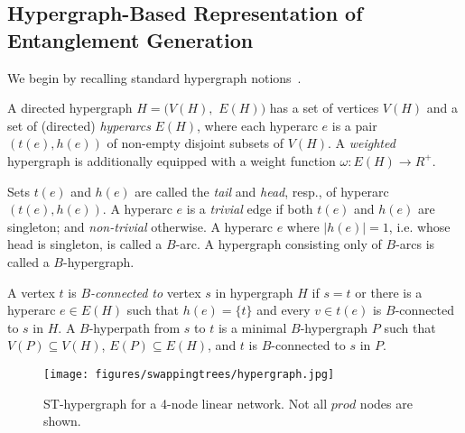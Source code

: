 \subsection{Hypergraph-Based Representation of Entanglement Generation}
We begin by recalling standard hypergraph notions~\cite{Beckenbach2019,GalloEtAl1993,ThakurTripathi2009}.

\label{defn:hypergraph}
\rm
  A directed hypergraph $H = (V(H),$ $E(H))$  has a set of vertices $V(H)$
  and a set of (directed) \emph{hyperarcs} $E(H)$, where each hyperarc $e$ is a
  pair $(t(e), h(e))$ 
  of non-empty disjoint subsets of $V(H)$.  
A \emph{weighted}
  hypergraph is additionally equipped with a weight function $\omega: E(H)
  \rightarrow R^+$.  

Sets $t(e)$ and $h(e)$ are 
  called the \emph{tail} and \emph{head}, resp., of hyperarc $(t(e),
  h(e))$.
A hyperarc $e$ is a \emph{trivial} edge if both $t(e)$ and $h(e)$ are
  singleton; and \emph{non-trivial} otherwise. 
A hyperarc $e$ where $|h(e)| = 1$, i.e. whose head is singleton, is called a $B$-arc.   A hypergraph consisting only of $B$-arcs is called a $B$-hypergraph.

 
\label{defn:hyperpath}
\rm
A vertex $t$ is \emph{$B$-connected to} vertex $s$ in hypergraph $H$ if
$s=t$ or there is a hyperarc $e \in E(H)$ such that $h(e) = \{t\}$ and
every $v \in t(e)$ is $B$-connected to $s$ in $H$.
%
A $B$-hyperpath from $s$ to $t$ is a minimal $B$-hypergraph $P$ 
such that $V(P) \subseteq V(H)$,  $E(P) \subseteq E(H)$, and $t$ is
$B$-connected to $s$ in $P$.

\begin{figure}
    \centering
    \texttt{[image: figures/swappingtrees/hypergraph.jpg]}
    \caption{ST-hypergraph for a 4-node linear network. Not all $prod$ nodes are shown.}
    \label{fig:swapping_LP}
\end{figure}

